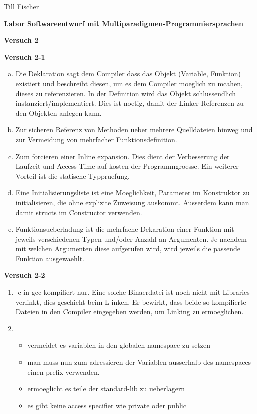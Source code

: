 \documentclass[german,10pt,oneside, fleqn, a4paper]{article}
\begin{document}
Till Fischer\\

    
\vspace{1cm}

\begin{center}
{\bf \Large Labor Softwareentwurf mit Multiparadigmen-Programmiersprachen} \\[2ex]
\end{center}
\begin{center}
{\bf \Large Versuch 2} \\[1ex]
\end{center}
\vspace{2cm}

{\bf Versuch 2-1} \\[2ex]
\begin{enumerate}[a)]
	\item Die Deklaration sagt dem Compiler dass das Objekt (Variable, Funktion) existiert und beschreibt diesen, um es dem Compiler moeglich zu mcahen, dieses zu referenzieren.
	In der Definition wird das Objekt schlussendlich instanziert/implementiert. Dies ist noetig, damit der Linker Referenzen zu den Objekten anlegen kann.
	\item Zur sicheren Referenz von Methoden ueber mehrere Quelldateien hinweg und zur Vermeidung von mehrfacher Funktionsdefinition.
	\item Zum forcieren einer Inline expansion. Dies dient der Verbesserung der Laufzeit und Access Time auf kosten der Programmgroesse. Ein weiterer Vorteil ist die statische Typpruefung.
	\item Eine Initialisierungsliste ist eine Moeglichkeit, Parameter im Konstruktor zu initialisieren, die ohne explizite Zuweisung auskommt. Ausserdem kann man damit structs im Constructor verwenden.
	\item Funktionsueberladung ist die mehrfache Dekaration einer Funktion mit jeweils verschiedenen Typen und/oder Anzahl an Argumenten. Je nachdem mit welchen Argumenten diese aufgerufen wird, wird jeweils die passende Funktion ausgewaehlt.
\end{enumerate}

{\bf Versuch 2-2} \\[2ex]
\begin{enumerate}[b]
	\item -c in gcc kompiliert nur. Eine solche Binaerdatei ist noch nicht mit Libraries verlinkt, dies geschieht beim L    inken. Er bewirkt, dass beide so kompilierte Dateien in den Compiler eingegeben werden, um Linking zu ermoeglichen.
	\item \begin{itemize}
		\item vermeidet es variablen in den globalen namespace zu setzen
		 \item man muss nun zum adressieren der Variablen ausserhalb des namespaces einen prefix verwenden.
		 \item ermoeglicht es teile der standard-lib zu ueberlagern
		 \item es gibt keine access specifier wie private oder public
	\end{itemize}
\end{enumerate}
\end{document}

